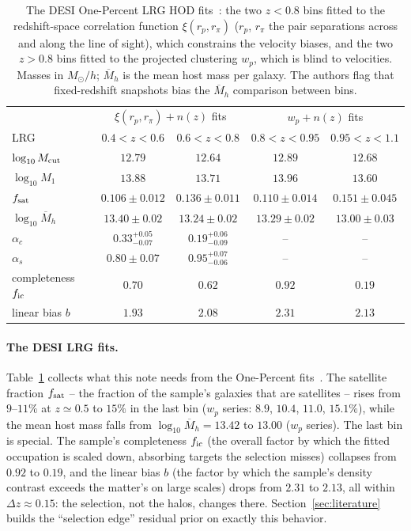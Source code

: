 \documentclass[11pt]{article}
\newcommand{\Msun}{M_\odot}
\begin{document}
\begin{table}[tbp]
  \centering
  \begin{tabular}{lcccc}
    \hline
    & \multicolumn{2}{c}{$\xi(r_p, r_\pi) + n(z)$ fits}
    & \multicolumn{2}{c}{$w_p + n(z)$ fits} \\
    LRG & $0.4 < z < 0.6$ & $0.6 < z < 0.8$
        & $0.8 < z < 0.95$ & $0.95 < z < 1.1$ \\
    \hline
    $\log_{10} M_{\rm cut}$ & $12.79$ & $12.64$ & $12.89$ & $12.68$ \\
    $\log_{10} M_1$ & $13.88$ & $13.71$ & $13.96$ & $13.60$ \\
    $f_{\rm sat}$ & $0.106 \pm 0.012$ & $0.136 \pm 0.011$
                  & $0.110 \pm 0.014$ & $0.151 \pm 0.045$ \\
    $\log_{10}\overline{M}_h$ & $13.40 \pm 0.02$ & $13.24 \pm 0.02$
                  & $13.29 \pm 0.02$ & $13.00 \pm 0.03$ \\
    $\alpha_c$ & $0.33^{+0.05}_{-0.07}$ & $0.19^{+0.06}_{-0.09}$
               & -- & -- \\
    $\alpha_s$ & $0.80 \pm 0.07$ & $0.95^{+0.07}_{-0.06}$ & -- & -- \\
    completeness $f_{\rm ic}$ & $0.70$ & $0.62$
               & $0.92$ & $0.19$ \\
    linear bias $b$ & $1.93$ & $2.08$ & $2.31$ & $2.13$ \\
    \hline
  \end{tabular}
  \caption{The DESI One-Percent LRG HOD fits~\cite{Yuan2023}: the two
    $z < 0.8$ bins fitted to the redshift-space correlation function
    $\xi(r_p, r_\pi)$ ($r_p$, $r_\pi$ the pair separations across and
    along the line of sight), which constrains the velocity biases, and the
    two $z > 0.8$ bins fitted to the projected clustering $w_p$, which
    is blind to velocities.  Masses in $\Msun/h$;
    $\overline{M}_h$ is the mean host mass per galaxy.  The authors
    flag that fixed-redshift snapshots bias the $\overline{M}_h$
    comparison between bins.}
  \label{tab:lrgfits}
\end{table}

\paragraph{The DESI LRG fits.}
Table~\ref{tab:lrgfits} collects what this note needs from the
One-Percent fits~\cite{Yuan2023}.  The satellite fraction
$f_{\rm sat}$ -- the fraction of the sample's galaxies that are
satellites -- rises from $9$--$11\%$ at $z \simeq 0.5$ to $15\%$ in
the last bin ($w_p$ series: $8.9$, $10.4$, $11.0$, $15.1\%$), while
the mean host mass falls from $\log_{10}\overline{M}_h = 13.42$ to
$13.00$ ($w_p$ series).  The last bin is special.  The sample's
completeness $f_{\rm ic}$ (the overall factor by which the fitted
occupation is scaled down, absorbing targets the selection misses)
collapses from $0.92$ to $0.19$, and the linear bias $b$ (the factor
by which the sample's density contrast exceeds the matter's on large
scales) drops from
$2.31$ to $2.13$, all within $\Delta z \approx 0.15$: the selection,
not the halos, changes there.  Section~\ref{sec:literature} builds the
``selection edge'' residual prior on exactly this behavior.
\end{document}
